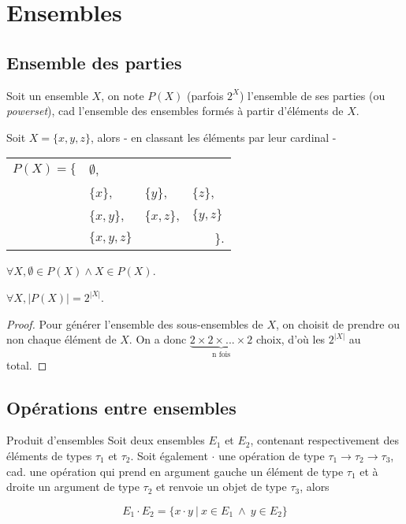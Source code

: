 \section{Ensembles}

\subsection{Ensemble des parties}
\label{powerset}
Soit un ensemble $X$, on note $P(X)$ (parfois $2^X$) l'ensemble de ses parties (ou \textit{powerset}), cad l'ensemble des ensembles formés à partir d'éléments de $X$. 

\begin{example}
Soit $X = \{x,y,z\}$, alors - en classant les éléments par leur cardinal -

\begin{tabular}{llll}
 $P(X) = \{$ & $\emptyset$, & & \\
& $\{x\}$,&$\{y\}$,&$\{z\}$,\\
&$\{x,y\}$,& $\{x,z\}$,&$\{y,z\}$\\
& $\{x,y,z\}$ & &$~~~~~~~~\}$.
\end{tabular}
\end{example}

\begin{lemma}
$\forall X, \emptyset \in P(X) \wedge X \in P(X)$.
\end{lemma}

\begin{lemma}
$\forall X, |P(X)| = 2^{|X|}$.
\end{lemma}

\begin{proof}
Pour générer l'ensemble des sous-ensembles de $X$, on choisit de prendre ou non chaque élément de $X$. On a donc $\underbrace{2 \times 2 \times ... \times 2}_{\textrm{n fois}}$ choix, d'où les $2^{|X|}$ au total.
\end{proof}

\subsection{Opérations entre ensembles}

\begin{definition}{Produit d'ensembles}{}
\label{ensprod}
Soit deux ensembles $E_1$ et $E_2$, contenant respectivement des éléments de types $\tau_1$ et $\tau_2$. Soit également $\cdot$ une opération de type $\tau_1 \rightarrow \tau_2 \rightarrow \tau_3$, cad. une opération qui prend en argument gauche un élément de type $\tau_1$ et à droite un argument de type $\tau_2$ et renvoie un objet de type $\tau_3$, alors 

\[
E_1 \cdot E_2 = \{x \cdot y~|~x \in E_1~\wedge~y \in E_2\}
\]
\end{definition}

